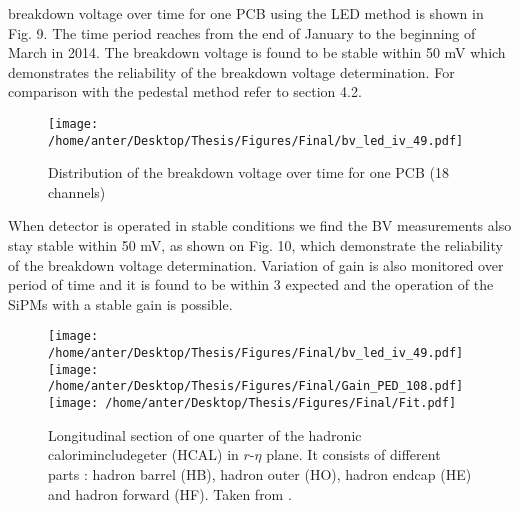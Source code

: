 breakdown voltage over time for one PCB using the LED method is shown in Fig. 9. The time
period reaches from the end of January to the beginning of March in 2014. The breakdown
voltage is found to be stable within 50 mV which demonstrates the reliability of the breakdown
voltage determination. For comparison with the pedestal method refer to section 4.2.

\begin{figure}[!h]
\begin{center}
\vspace*{3mm} 
\hspace*{-5mm}
\texttt{[image: /home/anter/Desktop/Thesis/Figures/Final/bv\_led\_iv\_49.pdf]}\\
\vspace*{4mm}
\caption{Distribution of the
breakdown voltage over time for one
PCB (18 channels)}
\label{fig:BV}
\end{center}
\end{figure}



When detector is operated in stable conditions we find the BV measurements also stay stable
within 50 mV, as shown on Fig. 10, which demonstrate the reliability of the breakdown voltage
determination. Variation of gain is also monitored over period of time and it is found to be
within 3%
expected and the operation of the SiPMs with a stable gain is possible.

\begin{figure}[!h]
\begin{center}
\vspace*{3mm} 
\hspace*{-5mm}
\texttt{[image: /home/anter/Desktop/Thesis/Figures/Final/bv\_led\_iv\_49.pdf]}\\
\texttt{[image: /home/anter/Desktop/Thesis/Figures/Final/Gain\_PED\_108.pdf]}\\
\texttt{[image: /home/anter/Desktop/Thesis/Figures/Final/Fit.pdf]}
\vspace*{4mm}
\caption[Longitudinal section of one quarter of the hadronic calorimeter (HCAL) in $r$-$\eta$ plane.]{Longitudinal section of one quarter of the hadronic calorimincludegeter (HCAL) in $r$-$\eta$ plane. It consists of different parts : hadron barrel (HB), hadron outer (HO), hadron endcap (HE) and hadron forward (HF). Taken from \cite{Chatrchyan:2008aa}.}
\label{fig:hcal}
\end{center}
\end{figure}

